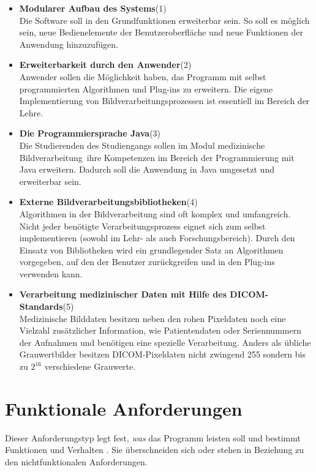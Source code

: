 \begin{itemize}
\item  \textbf{Modularer Aufbau des Systems}(1)\\
	  Die Software soll in den Grundfunktionen erweiterbar sein. So soll es möglich sein, neue Bedienelemente der Benutzeroberfläche und neue Funktionen der Anwendung hinzuzufügen.
	  
\item \textbf{Erweiterbarkeit durch den Anwender}(2)\\
	Anwender sollen die Möglichkeit haben, das Programm mit selbst programmierten Algorithmen und Plug-ins zu erweitern. Die eigene Implementierung von Bildverarbeitungsprozessen ist essentiell im Bereich der Lehre.
	
\item \textbf{Die Programmiersprache Java}(3)\\
	Die Studierenden des Studiengangs sollen im Modul \glqq medizinische Bildverarbeitung\grqq\ ihre Kompetenzen im Bereich der Programmierung mit Java erweitern. Dadurch soll die Anwendung in Java umgesetzt und erweiterbar sein.
	
\item \textbf{Externe Bildverarbeitungsbibliotheken}(4)\\
	Algorithmen in der Bildverarbeitung sind oft komplex und umfangreich. Nicht jeder benötigte Verarbeitungsprozess eignet sich zum selbst implementieren (sowohl im Lehr- als auch Forschungsbereich). Durch den Einsatz von Bibliotheken wird ein grundlegender Satz an Algorithmen vorgegeben, auf den der Benutzer zurückgreifen und in den Plug-ins verwenden kann.
	
\item \textbf{Verarbeitung medizinischer Daten mit Hilfe des DICOM-Standards}(5)\\
	Medizinische Bilddaten besitzen neben den rohen Pixeldaten noch eine Vielzahl zusätzlicher Information, wie Patientendaten oder Seriennummern der Aufnahmen und benötigen eine spezielle Verarbeitung. Anders als übliche Grauwertbilder besitzen DICOM-Pixeldaten nicht zwingend 255 sondern bis zu $2^{16}$ verschiedene Grauwerte.
\end{itemize}

\FloatBarrier
\section{Funktionale Anforderungen}

Dieser Anforderungstyp legt fest, \textit{was} das Programm leisten soll und bestimmt Funktionen und Verhalten \cite[9]{balzert:swa}. Sie überschneiden sich oder stehen in Beziehung zu den nichtfunktionalen Anforderungen.

